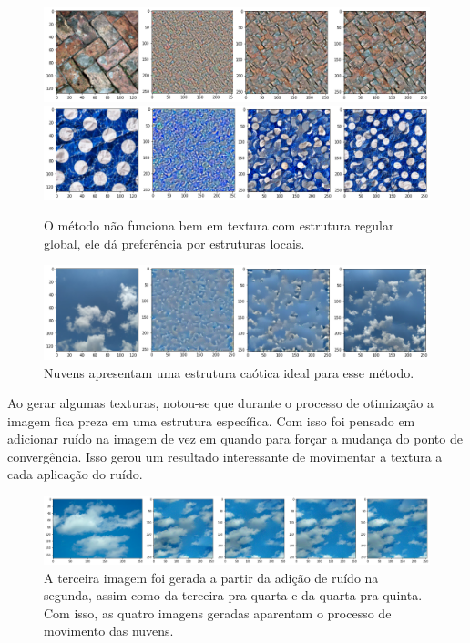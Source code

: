 \begin{figure}[!ht]
	\centering
	\includegraphics[width=\linewidth]{files/assets/results/result1.png}
	\includegraphics[width=\linewidth]{files/assets/results/result3.png}
	\caption{O método não funciona bem em textura com 
	estrutura regular global, ele dá preferência por
	estruturas locais. }
	\label{img:preview}
\end{figure}



\begin{figure}[!ht]
	\centering
	\includegraphics[width=\linewidth]{files/assets/results/result4.png}
	\caption{Nuvens apresentam uma estrutura caótica
	ideal para esse método.}
	\label{img:preview}
\end{figure}

Ao gerar algumas texturas, notou-se que durante
o processo de otimização a imagem fica preza em 
uma estrutura específica. Com isso foi pensado
em adicionar ruído na imagem de vez em quando
para forçar a mudança do ponto de convergência.
Isso gerou um resultado interessante de movimentar
a textura a cada aplicação do ruído.

\begin{figure}[!ht]
	\centering
	\includegraphics[width=\linewidth]{files/assets/results/result6.png}
	\caption{A terceira imagem foi gerada a partir da adição de ruído
		na segunda, assim como da terceira pra quarta e da quarta pra
		quinta. 
		Com isso, as quatro imagens geradas aparentam o processo
	de movimento das nuvens.}
	\label{img:preview}
\end{figure}

